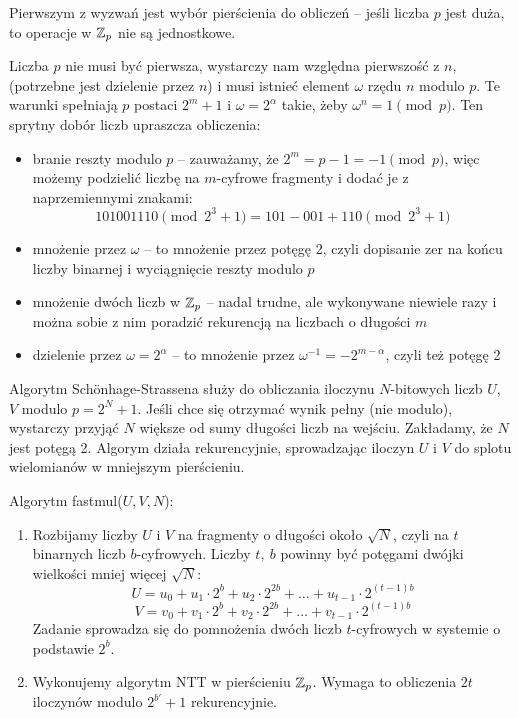 Pierwszym z wyzwań jest wybór pierścienia do obliczeń -- jeśli liczba \( p \) jest duża, to operacje w \( \mathbb{Z}_p \) nie są jednostkowe.

Liczba \( p \) nie musi być pierwsza, wystarczy nam względna pierwszość z \( n \), (potrzebne jest dzielenie przez \( n \)) i musi istnieć element \( \omega \) rzędu \( n \) modulo \( p \). Te warunki spełniają \( p \) postaci \( 2^m + 1 \) i \( \omega = 2^{\alpha} \) takie, żeby \( \omega^n = 1 \pmod{p} \). Ten sprytny dobór liczb upraszcza obliczenia:
\begin{itemize}
    \item branie reszty modulo \( p \) -- zauważamy, że \( 2^m = p - 1 = -1 \pmod{p} \), więc możemy podzielić liczbę na \( m \)-cyfrowe fragmenty i dodać je z naprzemiennymi znakami:
    \[
        101001110 \pmod{2^3 + 1} = 101 - 001 + 110 \pmod{2^3 + 1} 
    \]
    \item mnożenie przez \( \omega \) -- to mnożenie przez potęgę 2, czyli dopisanie zer na końcu liczby binarnej i wyciągnięcie reszty modulo \( p \)
    \item mnożenie dwóch liczb w \( \mathbb{Z}_p \) -- nadal trudne, ale wykonywane niewiele razy i można sobie z nim poradzić rekurencją na liczbach o długości \( m \)
    \item dzielenie przez \( \omega = 2^{\alpha} \) -- to mnożenie przez \( \omega^{-1} = -2^{m-\alpha} \), czyli też potęgę 2
\end{itemize}

Algorytm Sch{\"o}nhage-Strassena służy do obliczania iloczynu \( N \)-bitowych liczb \( U \), \( V \) modulo \( p = 2^N + 1 \).
Jeśli chce się otrzymać wynik pełny (nie modulo), wystarczy przyjąć \( N \) większe od sumy długości liczb na wejściu. Zakładamy, że \( N \) jest potęgą 2. Algorym działa rekurencyjnie, sprowadzając iloczyn \( U \) i \( V \) do splotu wielomianów w mniejszym pierścieniu.

\begin{greyframe}
    Algorytm fastmul(\( U, V, N \)):
    \begin{enumerate}
        \item Rozbijamy liczby \( U \) i \( V \) na fragmenty o długości około \( \sqrt{N} \), czyli na \( t \) binarnych liczb \( b \)-cyfrowych. Liczby \( t, \ b \) powinny być potęgami dwójki wielkości mniej więcej \( \sqrt{N} \):
        \[
            U = u_0 + u_1 \cdot 2^b + u_2 \cdot 2^{2b} + \ldots + u_{t-1} \cdot  2^{(t-1)b}
        \]
        \[
            V = v_0 + v_1 \cdot 2^b + v_2 \cdot 2^{2b} + \ldots + v_{t-1} \cdot 2^{(t-1)b}
        \]
        Zadanie sprowadza się do pomnożenia dwóch liczb \( t \)-cyfrowych w systemie o podstawie \( 2^b \).

        \item Wykonujemy algorytm NTT w pierścieniu \( \mathbb{Z}_p \). Wymaga to obliczenia \( 2t \) iloczynów modulo \( 2^{b'} + 1 \) rekurencyjnie.
    \end{enumerate}
\end{greyframe}

